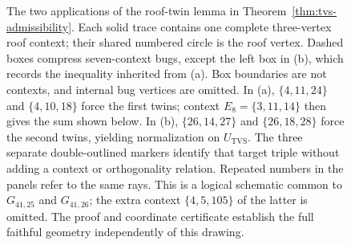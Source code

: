 \documentclass[aps,pra,reprint,superscriptaddress,longbibliography,nofootinbib,floatfix,10pt]{revtex4-2}
\theoremstyle{definition}\newtheorem{definition}[theorem]{Definition}
\theoremstyle{remark}\newtheorem{remark}[theorem]{Remark}
\begin{document}
\begin{figure}[!t]
{%
}
\caption{The two applications of the roof-twin lemma in Theorem~\ref{thm:tvs-admissibility}. Each solid trace contains one complete three-vertex roof context; their shared numbered circle is the roof vertex. Dashed boxes compress seven-context bugs, except the left box in (b), which records the inequality inherited from (a). Box boundaries are not contexts, and internal bug vertices are omitted. In (a), $\{4,11,24\}$ and $\{4,10,18\}$ force the first twins; context $E_8=\{3,11,14\}$ then gives the sum shown below. In (b), $\{26,14,27\}$ and $\{26,18,28\}$ force the second twins, yielding normalization on $U_{\mathrm{TVS}}$. The three separate double-outlined markers identify that target triple without adding a context or orthogonality relation. Repeated numbers in the panels refer to the same rays. This is a logical schematic common to $G_{41,25}$ and $G_{41,26}$; the extra context $\{4,5,105\}$ of the latter is omitted. The proof and coordinate certificate establish the full faithful geometry independently of this drawing.}\label{fig:TVS-admissibility}
\end{figure}
\end{document}
